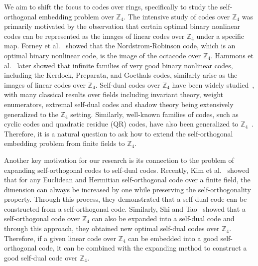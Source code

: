 \documentclass{article}
\theoremstyle{definition}
\theoremstyle{remark}
\begin{document}
We aim to shift the focus to codes over rings, specifically to study the self-orthogonal embedding problem over $\mathbb{Z}_4$. The intensive study of codes over $\mathbb{Z}_4$ was primarily motivated by the observation that certain optimal binary nonlinear codes can be represented as the images of linear codes over $\mathbb{Z}_4$ under a specific map. Forney et al.~\cite{FST-1992} showed that the Nordstrom-Robinson code, which is an optimal binary nonlinear code, is the image of the octacode over $\mathbb{Z}_4$. Hammons et al.~\cite{HKCSS-1994} later showed that infinite families of very good binary nonlinear codes, including the Kerdock, Preparata, and Goethals codes, similarly arise as the images of linear codes over $\mathbb{Z}_4$. Self-dual codes over $\mathbb{Z}_4$ have been widely studied~\cite{BSBM-1997,CS-1993,DHS-2001,FGPL-1998,G-1996,H-2010,H-2012,HK-2000,M-2024,R-1999,R-2000}, with many classical results over fields including invariant theory, weight enumerators, extremal self-dual codes and shadow theory being extensively generalized to the $\mathbb{Z}_4$ setting. Similarly, well-known families of codes, such as cyclic codes and quadratic residue (QR) codes, have also been generalized to $\mathbb{Z}_4$~\cite{BSC-1995,CMKH-1996,CS-1995,PQ-1996}. Therefore, it is a natural question to ask how to extend the self-orthogonal embedding problem from finite fields to $\mathbb{Z}_4$.

Another key motivation for our research is its connection to the problem of expanding self-orthogonal codes to self-dual codes. Recently, Kim et al.~\cite{KLL-2026} showed that for any Euclidean and Hermitian self-orthogonal code over a finite field, the dimension can always be increased by one while preserving the self-orthogonality property. Through this process, they demonstrated that a self-dual code can be constructed from a self-orthogonal code. Similarly, Shi and Tao~\cite{ST-2026} showed that a self-orthogonal code over $\mathbb{Z}_4$ can also be expanded into a self-dual code and through this approach, they obtained new optimal self-dual codes over $\mathbb{Z}_4$. Therefore, if a given linear code over $\mathbb{Z}_4$ can be embedded into a good self-orthogonal code, it can be combined with the expanding method to construct a good self-dual code over $\mathbb{Z}_4$.
\end{document}
